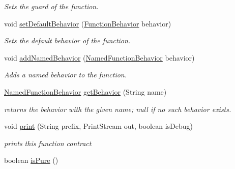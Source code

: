 \begin{DoxyCompactItemize}
\begin{DoxyCompactList}\small\item\em Sets the guard of the function. \end{DoxyCompactList}\item 
void \hyperlink{classedu_1_1udel_1_1cis_1_1vsl_1_1civl_1_1model_1_1common_1_1contract_1_1CommonFunctionContract_a8eecbe4d9fc941aade938a563e152fc1}{set\+Default\+Behavior} (\hyperlink{interfaceedu_1_1udel_1_1cis_1_1vsl_1_1civl_1_1model_1_1IF_1_1contract_1_1FunctionBehavior}{Function\+Behavior} behavior)
\begin{DoxyCompactList}\small\item\em Sets the default behavior of the function. \end{DoxyCompactList}\item 
void \hyperlink{classedu_1_1udel_1_1cis_1_1vsl_1_1civl_1_1model_1_1common_1_1contract_1_1CommonFunctionContract_a8bb0db19cff80c477f508050f6f0dbca}{add\+Named\+Behavior} (\hyperlink{interfaceedu_1_1udel_1_1cis_1_1vsl_1_1civl_1_1model_1_1IF_1_1contract_1_1NamedFunctionBehavior}{Named\+Function\+Behavior} behavior)
\begin{DoxyCompactList}\small\item\em Adds a named behavior to the function. \end{DoxyCompactList}\item 
\hyperlink{interfaceedu_1_1udel_1_1cis_1_1vsl_1_1civl_1_1model_1_1IF_1_1contract_1_1NamedFunctionBehavior}{Named\+Function\+Behavior} \hyperlink{classedu_1_1udel_1_1cis_1_1vsl_1_1civl_1_1model_1_1common_1_1contract_1_1CommonFunctionContract_a8f951e7c091d223ba10d0e46862127bc}{get\+Behavior} (String name)
\begin{DoxyCompactList}\small\item\em returns the behavior with the given name; null if no such behavior exists. \end{DoxyCompactList}\item 
void \hyperlink{classedu_1_1udel_1_1cis_1_1vsl_1_1civl_1_1model_1_1common_1_1contract_1_1CommonFunctionContract_a7b5170edf0e181309b4206d2326d7814}{print} (String prefix, Print\+Stream out, boolean is\+Debug)
\begin{DoxyCompactList}\small\item\em prints this function contract \end{DoxyCompactList}\item 
boolean \hyperlink{classedu_1_1udel_1_1cis_1_1vsl_1_1civl_1_1model_1_1common_1_1contract_1_1CommonFunctionContract_a29f2f6c9655da3bd77549c859ac941be}{is\+Pure} ()

\end{DoxyCompactItemize}
